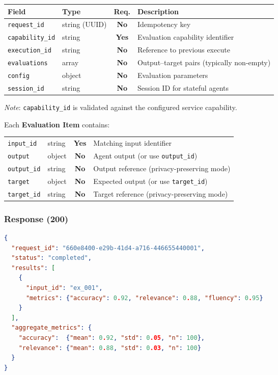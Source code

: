 \documentclass[11pt,a4paper]{article}
\newcommand{\field}[1]{\texttt{#1}}
\newcommand{\required}{\textbf{Yes}}
\newcommand{\optional}{\textbf{No}}
\begin{document}
\begin{center}\small
\begin{tabularx}{\textwidth}{@{}llcX@{}}
\toprule
\textbf{Field} & \textbf{Type} & \textbf{Req.} & \textbf{Description} \\
\midrule
\field{request\_id}    & string (UUID) & \optional & Idempotency key \\
\field{capability\_id} & string        & \required & Evaluation capability identifier \\
\field{execution\_id}  & string        & \optional & Reference to previous execute \\
\field{evaluations}    & array         & \optional & Output--target pairs (typically non-empty) \\
\field{config}         & object        & \optional & Evaluation parameters \\
\field{session\_id}    & string        & \optional & Session ID for stateful agents \\
\bottomrule
\end{tabularx}
\end{center}

\textit{Note}: \field{capability\_id} is validated against the configured service capability.

Each \textbf{Evaluation Item} contains:

\begin{center}\small
\begin{tabularx}{\textwidth}{@{}llcX@{}}
\toprule
\field{input\_id}   & string & \required & Matching input identifier \\
\field{output}      & object & \optional & Agent output (or use \field{output\_id}) \\
\field{output\_id}  & string & \optional & Output reference (privacy-preserving mode) \\
\field{target}      & object & \optional & Expected output (or use \field{target\_id}) \\
\field{target\_id}  & string & \optional & Target reference (privacy-preserving mode) \\
\bottomrule
\end{tabularx}
\end{center}

\subsubsection{Response (200)}

\begin{lstlisting}[language=json]
{
  "request_id": "660e8400-e29b-41d4-a716-446655440001",
  "status": "completed",
  "results": [
    {
      "input_id": "ex_001",
      "metrics": {"accuracy": 0.92, "relevance": 0.88, "fluency": 0.95}
    }
  ],
  "aggregate_metrics": {
    "accuracy":  {"mean": 0.92, "std": 0.05, "n": 100},
    "relevance": {"mean": 0.88, "std": 0.03, "n": 100}
  }
}
\end{lstlisting}
\end{document}
